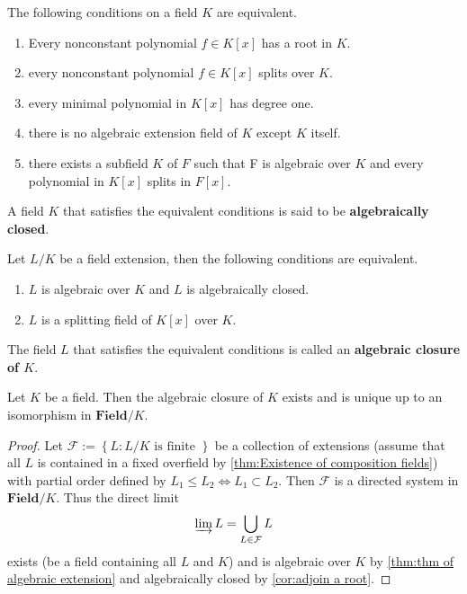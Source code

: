 \begin{theorem}
    The following conditions on a field $K$ are equivalent.
    \begin{enumerate}
        \item
              Every nonconstant polynomial $f\in K[x]$ has a root in $K$.

        \item
              every nonconstant polynomial $f\in K[x]$ splits over $K$.

        \item
              every minimal polynomial in $K[x]$ has degree one.

        \item
              there is no algebraic extension field of $K$ except $K$ itself.

        \item
              there exists a subfield $K$ of $F$ such that F is algebraic over $K$ and every polynomial in $ K [ x ]$ splits in ${F}[ x ]$.
    \end{enumerate}
    A field $K$ that satisfies the equivalent conditions is said to be \textbf{algebraically closed}.
\end{theorem}

\begin{definition}
    Let $L/K$ be a field extension, then the following conditions are equivalent.
    \begin{enumerate}
        \item
              $L$ is algebraic over $K$ and $L$ is algebraically closed.

        \item
              $L$ is a splitting field of $ K[x]$ over $K$.
    \end{enumerate}
    The field $L$ that satisfies the equivalent conditions is called an \textbf{algebraic closure of $K$}.
\end{definition}

\begin{theorem}
    Let $K$ be a field.
    Then the algebraic closure of $K$ exists and is unique up to an isomorphism in $\mathbf{Field}/K$.
    \begin{proof}
        Let $\mathcal{F}:=\left\{L: L/K \text{ is finite }\right\}$ be a collection of extensions (assume that all $L$ is contained in a fixed overfield by \cref{thm:Existence of composition fields}) with partial order defined by $L_1\leq L_2 \Leftrightarrow L_1\subset L_2$.
        Then $\mathcal{F}$ is a directed system in $\mathbf{Field}/K$. Thus the direct limit
        \begin{equation*}
            \varinjlim L
            =
            \bigcup_{L\in \mathcal{F}} L
        \end{equation*}
        exists (be a field containing all $L$ and $K$) and is algebraic over $K$ by \cref{thm:thm of algebraic extension} and algebraically closed by \cref{cor:adjoin a root}.
    \end{proof}
\end{theorem}

